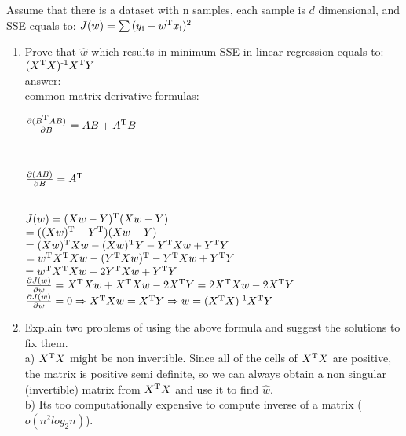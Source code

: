 \documentclass[11pt,letterpaper]{article}
\newcounter{problem}
\begin{document}
\begin{exercise}
Assume that there is a dataset with n samples, each sample is $d$ dimensional, and SSE equals to:
$J(w) = \sum{(y\textsubscript{i} - w\textsuperscript{T}x\textsubscript{i})\textsuperscript{2}}$
   \begin{enumerate}
        \item Prove that $\hat{w}$ which results in minimum SSE in linear regression equals to:
        $(X\textsuperscript{T}X)\textsuperscript{-1}X\textsuperscript{T}Y$
        \\ answer:
        \\ common matrix derivative formulas:
        \\ \centerline{$\frac{\partial{(B\textsuperscript{T}AB)}}{\partial{B}} = AB + A\textsuperscript{T}B$}
        \\ \centerline{$\frac{\partial{(AB)}}{\partial{B}} = A\textsuperscript{T}$}
        \\ $J(w) = (Xw - Y)\textsuperscript{T}(Xw - Y)$
        \\ $ = ((Xw)\textsuperscript{T} - Y\textsuperscript{T})(Xw - Y)$
        \\ $ = (Xw)\textsuperscript{T}Xw - (Xw)\textsuperscript{T}Y - Y\textsuperscript{T}Xw + Y\textsuperscript{T}Y$
        \\ $ = w\textsuperscript{T}X\textsuperscript{T}Xw - (Y\textsuperscript{T}Xw)\textsuperscript{T} - Y\textsuperscript{T}Xw + Y\textsuperscript{T}Y$
        \\ $ = w\textsuperscript{T}X\textsuperscript{T}Xw - 2Y\textsuperscript{T}Xw + Y\textsuperscript{T}Y$
        \\ $\frac{\partial{J(w)}}{\partial{w}} = X\textsuperscript{T}Xw + X\textsuperscript{T}Xw - 2X\textsuperscript{T}Y = 2X\textsuperscript{T}Xw - 2X\textsuperscript{T}Y $
        \\ $\frac{\partial{J(w)}}{\partial{w}} = 0 \Rightarrow X\textsuperscript{T}Xw = X\textsuperscript{T}Y \Rightarrow w = (X\textsuperscript{T}X)\textsuperscript{-1}X\textsuperscript{T}Y$
        
        \item Explain two problems of using the above formula and suggest the solutions to fix them.
        \\a) $X\textsuperscript{T}X$ might be non invertible. Since all of the cells of $X\textsuperscript{T}X$ are positive, the matrix is positive semi definite, so we can always obtain a non singular (invertible) matrix from $X\textsuperscript{T}X$ and use it to find $\hat{w}$.
        \\b)
        Its too computationally expensive to compute inverse of a matrix ($o(n^2{log_2 n})$).
        

\end{enumerate}
\end{exercise}
\end{document}
